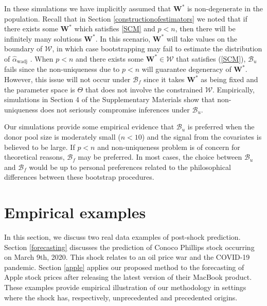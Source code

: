 \documentclass[11pt,3p,review,authoryear]{elsarticle}
\def\mbf#1{\mathbf{#1}} %
\def\mrm#1{\mathrm{#1}} %
\def\mc#1{\mathcal{#1}} %
\theoremstyle{definition}
\begin{document}
 
In these simulations we have implicitly assumed that $\mathbf{W}^*$ is non-degenerate in the population.  Recall that in Section \ref{constructionofestimators} we noted that if there exists some $\mathbf{W}^*$ which satisfies \eqref{SCM} and $p < n$, then there will be infinitely many solutions $\mathbf{W}^*$. In this scenario, $\mathbf{W}^*$ will take values on the boundary of $\mc{W}$, in which case bootstrapping may fail to estimate the distribution of $\hat{\alpha}_{\mrm{wadj}}$ \citep{andrews2000inconsistency}.  When $p < n$ and there exists some $\mathbf{W}^*\in \mc{W}$ that satisfies (\ref{SCM}), $\mc{B}_u$ fails since the non-uniqueness due to $p < n$ will guarantee degeneracy of  $\mathbf{W}^*$. However, this issue will not occur under $\mc{B}_f$ since it takes $\mbf{W}^*$ as being fixed and the parameter space is $\Theta$ that does not involve the constrained $\mc{W}$. Empirically, simulations in Section 4 of the Supplementary Materials show that non-uniqueness does not seriously compromise inferences under $\mc{B}_u$. 

Our simulations provide some empirical evidence that $\mathcal{B}_u$ is preferred when the donor pool size is moderately small ($n< 10$) and the signal from the covariates is believed to be large. If $p < n$ and non-uniqueness problem is of concern for theoretical reasons,  $\mathcal{B}_f$ may be preferred. In most cases, the choice between $\mathcal{B}_u$  and  $\mathcal{B}_f$ would be up to personal preferences related to the philosophical differences between these bootstrap procedures.

\section{Empirical examples}

In this section, we discuss two real data examples of post-shock prediction. Section \ref{forecasting} discusses the prediction of Conoco Phillips stock occurring on March 9th, 2020. This shock relates to an oil price war and the COVID-19 pandemic. Section \ref{apple} applies our proposed method to the forecasting of Apple stock prices after releasing the latest version of their MacBook product. These examples provide empirical illustration of our methodology in settings where the shock has, respectively, unprecedented and precedented origins.  %
\end{document}
